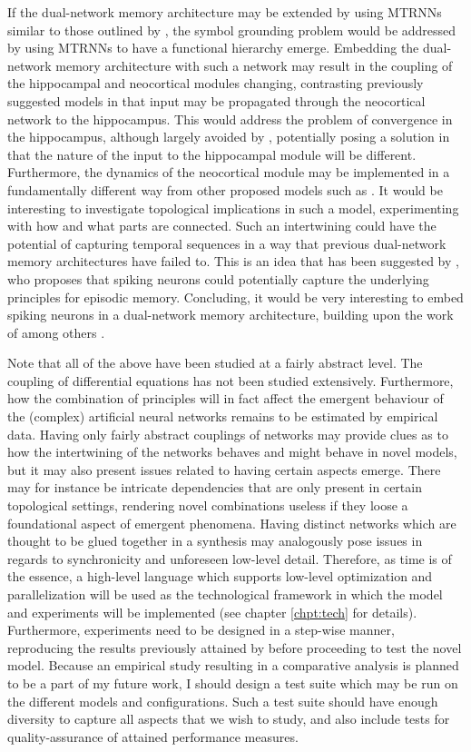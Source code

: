 If the dual-network memory architecture may be extended by using MTRNNs similar to those outlined by \cite{Tani2014}, the symbol grounding problem would be addressed by using MTRNNs to have a functional hierarchy emerge. Embedding the dual-network memory architecture with such a network may result in the coupling of the hippocampal and neocortical modules changing, contrasting previously suggested models in that input may be propagated through the neocortical network to the hippocampus.
This would address the problem of convergence in the hippocampus, although largely avoided by \cite{Hattori2014}, potentially posing a solution in that the nature of the input to the hippocampal module will be different. Furthermore, the dynamics of the neocortical module may be implemented in a fundamentally different way from other proposed models such as \cite{Ans1997, Ans2000, French2001, Hattori2010, Hattori2014}. 
It would be interesting to investigate topological implications in such a model, experimenting with how and what parts are connected.
Such an intertwining could have the potential of capturing temporal sequences in a way that previous dual-network memory architectures have failed to. This is an idea that has been suggested by \cite{Hattori2014}, who proposes that spiking neurons could potentially capture the underlying principles for episodic memory. Concluding, it would be very interesting to embed spiking neurons in a dual-network memory architecture, building upon the work of among others \cite{Yamashita2008, McClelland1995, Hattori2014}.

Note that all of the above have been studied at a fairly abstract level. The coupling of differential equations has not been studied extensively. Furthermore, how the combination of principles will in fact affect the emergent behaviour of the (complex) artificial neural networks remains to be estimated by empirical data. Having only fairly abstract couplings of networks may provide clues as to how the intertwining of the networks behaves and might behave in novel models, but it may also present issues related to having certain aspects emerge. There may for instance be intricate dependencies that are only present in certain topological settings, rendering novel combinations useless if they loose a foundational aspect of emergent phenomena. Having distinct networks which are thought to be glued together in a synthesis may analogously pose issues in regards to synchronicity and unforeseen low-level detail.
Therefore, as time is of the essence, a high-level language which supports low-level optimization and parallelization will be used as the technological framework in which the model and experiments will be implemented (see chapter \ref{chpt:tech} for details).
Furthermore, experiments need to be designed in a step-wise manner, reproducing the results previously attained by \cite{Hattori2014} before proceeding to test the novel model. Because an empirical study resulting in a comparative analysis is planned to be a part of my future work, I should design a test suite which may be run on the different models and configurations. Such a test suite should have enough diversity to capture all aspects that we wish to study, and also include tests for quality-assurance of attained performance measures.

